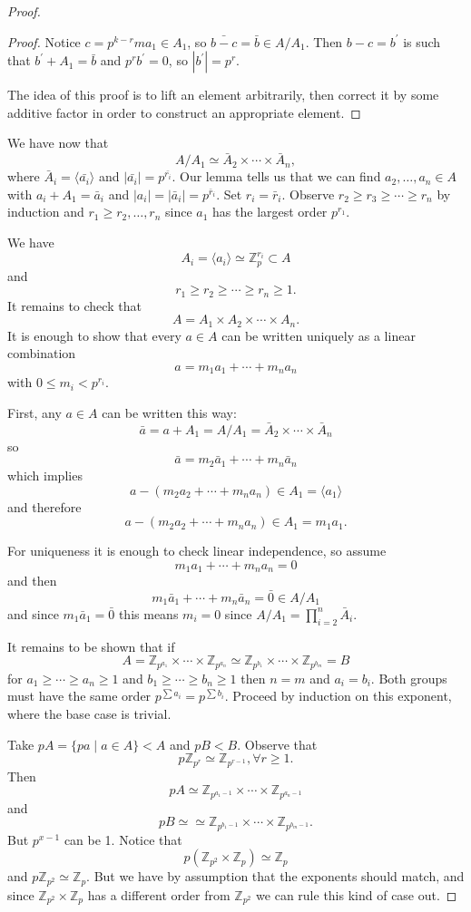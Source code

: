 \begin{proof}
\begin{proof}
Notice $c = p^{k-r} m a_1 \in A_1$, so $\bar{b - c} = \bar{b} \in A /
A_1$. Then $b - c = b^\prime$ is such that $b^\prime + A_1 = \bar{b}$
and $p^r b^\prime = 0$, so $|b^\prime| = p^r$.

The idea of this proof is to lift an element arbitrarily, then correct
it by some additive factor in order to construct an appropriate element.
\end{proof}

We have now that
$$
A / A_1 \simeq \bar{A}_2 \times \cdots \times \bar{A}_n,
$$
where $\bar{A}_i = \langle \bar{a_i} \rangle$ and
$|\bar{a_i}| = p^{\bar{r_i}}$. Our lemma tells us that we can find
 $a_2, \dots, a_n \in A$ with $a_i + A_1 = \bar{a}_i$ and
$|a_i| = |\bar{a}_i| = p^{\bar{r}_i}$. Set $r_i = \bar{r}_i$. Observe
$r_2 \geq r_3 \geq \cdots \geq r_n$ by induction and
$r_1 \geq r_2, \dots,  r_n$ since $a_1$ has the largest order
$p^{r_1}$.

We have
$$
A_i = \langle a_i \rangle \simeq \mathbb{Z}_p^{r_i} \subset A
$$
and
$$
r_1 \geq r_2 \geq \cdots \geq r_n \geq 1.
$$
It remains to check that
$$
A = A_1 \times A_2 \times \cdots \times A_n.
$$
It is enough to show that every $a \in A$ can be written uniquely as a
linear combination
$$
a = m_1 a_1 + \cdots + m_n a_n
$$
with $0 \leq m_i < p^{r_i}$.

First, any $a \in A$ can be written this way:
$$
\bar{a} = a + A_1 = A / A_1 = \bar{A}_2 \times \cdots \times \bar{A}_n
$$
so
$$
\bar{a} = m_2 \bar{a}_1 + \cdots + m_n \bar{a}_n
$$
which implies
$$
a - (m_2 a_2 + \cdots + m_n a_n) \in A_1 = \langle a_1 \rangle
$$
and therefore
$$
a - (m_2 a_2 + \cdots + m_n a_n) \in A_1 = m_1 a_1.
$$

For uniqueness it is enough to check linear independence, so assume
$$
m_1 a_1 + \cdots + m_n a_n = 0
$$
and then
$$
m_1 \bar{a}_1 + \cdots + m_n \bar{a}_n = \bar{0} \in A / A_1
$$
and since $m_1 \bar{a}_1 = \bar{0}$ this means $m_i = 0$ since
$A / A_1 = \prod_{i=2}^n \bar{A}_i$.

It remains to be shown that if
$$
A =
\mathbb{Z}_{p^{a_1}} \times \cdots \times \mathbb{Z}_{p^{a_n}}
\simeq
\mathbb{Z}_{p^{b_1}} \times \cdots \times \mathbb{Z}_{p^{b_m}}
= B
$$
for $a_1 \geq \cdots \geq a_n \geq 1$ and
$b_1 \geq \cdots \geq b_n \geq 1$ then $n = m$ and $a_i = b_i$.
Both groups must have the same order $p^{\sum a_i} = p^{\sum
  b_i}$. Proceed by induction on this exponent, where the base case is
trivial.

Take $p A = \{ p a \mid a \in A \} < A$ and $p B < B$. Observe that
$$
p \mathbb{Z}_{p^r} \simeq \mathbb{Z}_{p^{r-1}}, \forall r \geq 1.
$$
Then
$$
p A \simeq \mathbb{Z}_{p^{a_1 - 1}}
           \times \cdots \times
           \mathbb{Z}_{p^{a_n - 1}}
$$
and
$$
pB \simeq \simeq \mathbb{Z}_{p^{b_1 - 1}}
           \times \cdots \times
           \mathbb{Z}_{p^{b_m - 1}}.
$$
But $p^{x - 1}$ can be 1. Notice that
$$
p (\mathbb{Z}_{p^2} \times \mathbb{Z}_p) \simeq \mathbb{Z}_p
$$
and $p \mathbb{Z}_{p^2} \simeq \mathbb{Z}_p$. But we have by
assumption that the exponents should match, and since
$\mathbb{Z}_{p^2} \times \mathbb{Z}_p$ has a different order from
$\mathbb{Z}_{p^2}$ we can rule this kind of case out.
\end{proof}

